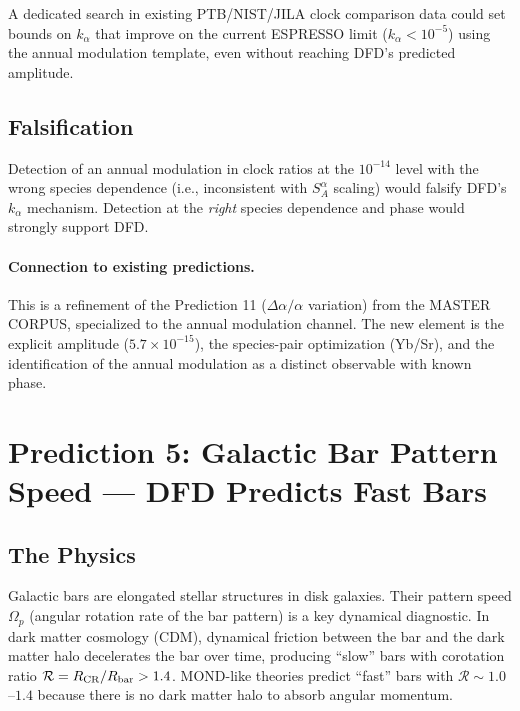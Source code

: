 \documentclass[11pt]{article}
\begin{document}
A dedicated search in existing PTB/NIST/JILA clock comparison data could set bounds on
$k_\alpha$ that improve on the current ESPRESSO limit ($k_\alpha < 10^{-5}$) using
the annual modulation template, even without reaching DFD's predicted amplitude.

\subsection{Falsification}

Detection of an annual modulation in clock ratios at the $10^{-14}$ level with the
wrong species dependence (i.e., inconsistent with $S_A^\alpha$ scaling) would falsify
DFD's $k_\alpha$ mechanism. Detection at the \emph{right} species dependence and
phase would strongly support DFD.

\paragraph{Connection to existing predictions.} This is a refinement of the
Prediction 11 ($\Delta\alpha/\alpha$ variation) from the MASTER CORPUS, specialized
to the annual modulation channel. The new element is the explicit amplitude
($5.7 \times 10^{-15}$), the species-pair optimization (Yb/Sr), and the identification
of the annual modulation as a distinct observable with known phase.

\section{Prediction 5: Galactic Bar Pattern Speed --- DFD Predicts Fast Bars}
\label{sec:bars}

\subsection{The Physics}

Galactic bars are elongated stellar structures in disk galaxies. Their pattern speed
$\Omega_p$ (angular rotation rate of the bar pattern) is a key dynamical diagnostic.
In dark matter cosmology (CDM), dynamical friction between the bar and the dark matter
halo decelerates the bar over time, producing ``slow'' bars with corotation ratio
$\mathcal{R} = R_{\rm CR}/R_{\rm bar} > 1.4$. MOND-like theories predict ``fast''
bars with $\mathcal{R} \sim 1.0$--$1.4$ because there is no dark matter halo to
absorb angular momentum.
\end{document}
